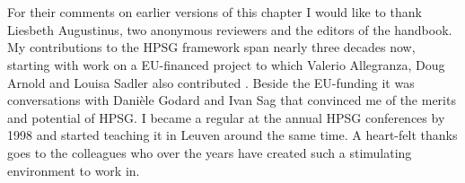 \documentclass[output=paper,biblatex,babelshorthands,newtxmath,draftmode,colorlinks,citecolor=brown]{langscibook}
\begin{document}
 
\section*{\acknowledgmentsUS}


For their comments on earlier versions of this chapter I would like to thank 
Liesbeth Augustinus, two anonymous reviewers and the editors of the handbook.  
My contributions to the HPSG framework span nearly three decades now, 
starting with work on a EU-financed project to which Valerio Allegranza, 
Doug Arnold and Louisa Sadler also contributed \citep{VanEyndeSchmidt98}. 
Beside the EU-funding it was conversations with Dani\`ele Godard and Ivan Sag 
that convinced me of the merits and potential of HPSG.  
I became a regular at the annual HPSG conferences by 1998 and started teaching it in Leuven around 
the same time. A heart-felt thanks goes to the colleagues who over the years have created such a stimulating
environment to work in.        

{\sloppy
\printbibliography[heading=subbibliography,notkeyword=this] 
}
\end{document}
